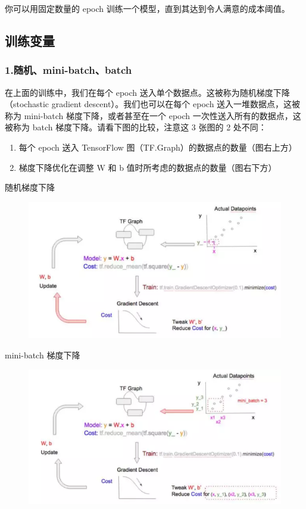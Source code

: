 \documentclass[11pt]{book} %
\begin{document}
你可以用固定数量的 epoch 训练一个模型，直到其达到令人满意的成本阈值。

\subsection{训练变量}

\subsubsection{1.随机、mini-batch、batch}
在上面的训练中，我们在每个 epoch 送入单个数据点。这被称为随机梯度下降（stochastic gradient descent）。我们也可以在每个 epoch 送入一堆数据点，这被称为 mini-batch 梯度下降，或者甚至在一个 epoch 一次性送入所有的数据点，这被称为 batch 梯度下降。请看下图的比较，注意这 3 张图的 2 处不同：

\begin{enumerate}
\item 每个 epoch 送入 TensorFlow 图（TF.Graph）的数据点的数量（图右上方）
\item 梯度下降优化在调整 W 和 b 值时所考虑的数据点的数量（图右下方）
\end{enumerate}

随机梯度下降

\begin{figure}
\centering
\includegraphics[width=0.7\linewidth]{figures/down}
\caption{}
\label{fig:down}
\end{figure}


mini-batch 梯度下降
\begin{figure}
\centering
\includegraphics[width=0.7\linewidth]{figures/minibatch}
\caption{}
\label{fig:minibatch}
\end{figure}
\end{document}
